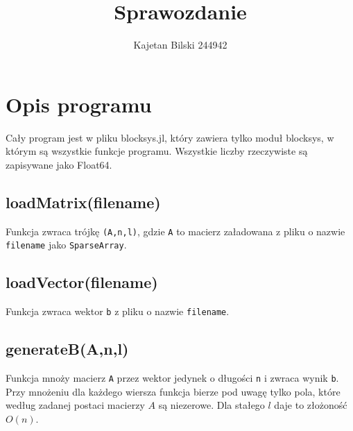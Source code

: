\documentclass{article}
\title{Sprawozdanie}
\author{Kajetan Bilski 244942}
\begin{document}
	\maketitle

\section{Opis programu}
Cały program jest w pliku blocksys.jl, który zawiera tylko moduł blocksys, w którym są wszystkie funkcje programu. Wszystkie liczby rzeczywiste są zapisywane jako Float64.
\subsection{loadMatrix(filename)}
Funkcja zwraca trójkę \verb|(A,n,l)|, gdzie \verb|A| to macierz załadowana z pliku o nazwie \verb|filename| jako \verb|SparseArray|.
\subsection{loadVector(filename)}
Funkcja zwraca wektor \verb|b| z pliku o nazwie \verb|filename|.
\subsection{generateB(A,n,l)}
Funkcja mnoży macierz \verb|A| przez wektor jedynek o długości \verb|n| i zwraca wynik \verb|b|. Przy mnożeniu dla każdego wiersza funkcja bierze pod uwagę tylko pola, które według zadanej postaci macierzy $A$ są niezerowe. Dla stałego $l$ daje to złożoność $O(n)$.
\end{document}
